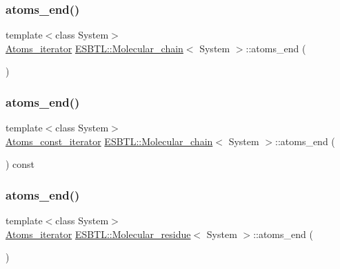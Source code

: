 \mbox{\label{group__grp__iters_gaaacb84783e8dd81f5013c85165b3707b}} 
\subsubsection{\texorpdfstring{atoms\+\_\+end()}{atoms\_end()}\hspace{0.1cm}{\footnotesize\ttfamily [5/8]}}
{\footnotesize\ttfamily template$<$class System$>$ \\
\hyperlink{group__grp__iters_gab2ee52ce4f9b656648669214cc44a4ea}{Atoms\+\_\+iterator} \hyperlink{classESBTL_1_1Molecular__chain}{E\+S\+B\+T\+L\+::\+Molecular\+\_\+chain}$<$ System $>$\+::atoms\+\_\+end (\begin{DoxyParamCaption}{ }\end{DoxyParamCaption})\hspace{0.3cm}{\ttfamily [inline]}}

\mbox{\label{group__grp__iters_ga925ea88c3cb1be749a9256b9ea77bc79}} 
\subsubsection{\texorpdfstring{atoms\+\_\+end()}{atoms\_end()}\hspace{0.1cm}{\footnotesize\ttfamily [6/8]}}
{\footnotesize\ttfamily template$<$class System$>$ \\
\hyperlink{group__grp__iters_gad872d386b268126c9bb2a2127a6a7254}{Atoms\+\_\+const\+\_\+iterator} \hyperlink{classESBTL_1_1Molecular__chain}{E\+S\+B\+T\+L\+::\+Molecular\+\_\+chain}$<$ System $>$\+::atoms\+\_\+end (\begin{DoxyParamCaption}{ }\end{DoxyParamCaption}) const\hspace{0.3cm}{\ttfamily [inline]}}

\mbox{\label{group__grp__iters_ga628b784affe52d58322c5f405b454def}} 
\subsubsection{\texorpdfstring{atoms\+\_\+end()}{atoms\_end()}\hspace{0.1cm}{\footnotesize\ttfamily [7/8]}}
{\footnotesize\ttfamily template$<$class System$>$ \\
\hyperlink{group__grp__iters_ga4f220ea2d647f555b579a7ab2831baa7}{Atoms\+\_\+iterator} \hyperlink{classESBTL_1_1Molecular__residue}{E\+S\+B\+T\+L\+::\+Molecular\+\_\+residue}$<$ System $>$\+::atoms\+\_\+end (\begin{DoxyParamCaption}{ }\end{DoxyParamCaption})\hspace{0.3cm}{\ttfamily [inline]}}

